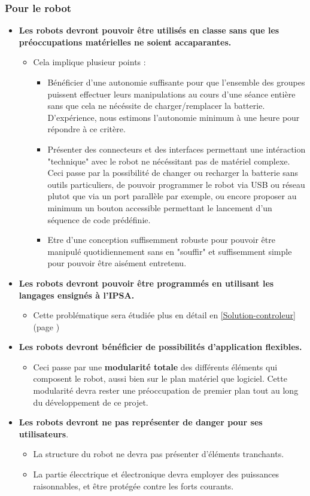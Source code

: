 	\subsubsection{Pour le robot}
		\begin{itemize}
			\item \textbf{Les robots devront pouvoir être utilisés en classe sans que les préoccupations matérielles ne soient accaparantes.}
			\begin{itemize}
				\item Cela implique plusieur points :
				\begin{itemize}
					\item Bénéficier d'une autonomie suffisante pour que l'ensemble des groupes puissent effectuer leurs manipulations au cours d'une séance entière sans que cela ne nécéssite de charger/remplacer la batterie. D'expérience, nous estimons l'autonomie minimum à une heure pour répondre à ce critère.
					\item Présenter des connecteurs et des interfaces permettant une intéraction "technique" avec le robot ne nécéssitant pas de matériel complexe. Ceci passe par la possibilité de changer ou recharger la batterie sans outils particuliers, de pouvoir programmer le robot via USB ou réseau plutot que via un port parallèle par exemple, ou encore proposer au minimum un bouton accessible permettant le lancement d'un séquence de code prédéfinie.
					\item Etre d'une conception suffisemment robuste pour pouvoir être manipulé quotidiennement sans en "souffir" et suffisemment simple pour pouvoir être aisément entretenu.
				\end{itemize} 
			\end{itemize}
			\item \textbf{Les robots devront pouvoir être programmés en utilisant les langages ensignés à l'IPSA.}
			\begin{itemize}
				\item Cette problématique sera étudiée plus en détail en \ref{Solution-controleur} (page \pageref{Solution-controleur})
			\end{itemize}
			\item \textbf{Les robots devront bénéficier de possibilités d'application flexibles.}
			\begin{itemize}
				\item Ceci passe par une \textbf{modularité totale} des différents éléments qui composent le robot, aussi bien sur le plan matériel que logiciel. Cette modularité devra rester une préoccupation de premier plan tout au long du développement de ce projet.
			\end{itemize}
			\item \textbf{Les robots devront ne pas représenter de danger pour ses utilisateurs}.
			\begin{itemize}
				\item La structure du robot ne devra pas présenter d'éléments tranchants.
				\item La partie élecctrique et électronique devra employer des puissances raisonnables, et être protégée contre les forts courants.
			\end{itemize}
		\end{itemize}


